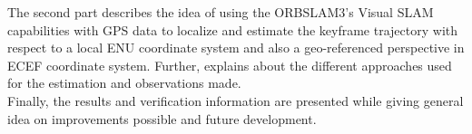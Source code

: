 The second part describes the idea of using the ORBSLAM3's Visual SLAM capabilities with GPS data to localize and estimate the keyframe trajectory with respect to a local ENU coordinate system and also a geo-referenced perspective in ECEF coordinate system. Further, explains about the different approaches used for the estimation and observations made.\\

Finally, the results and verification information are presented while giving general idea on improvements possible and future development.
